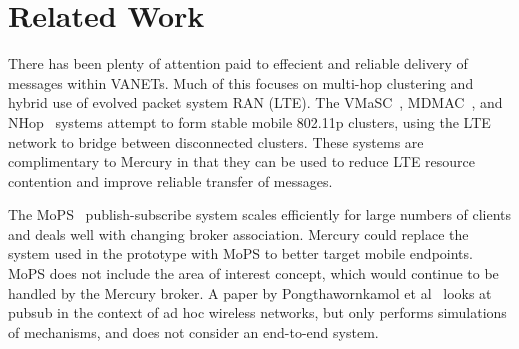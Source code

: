 \section{Related Work}

There has been plenty of attention paid to effecient and reliable
delivery of messages within VANETs.  Much of this focuses on multi-hop
clustering and hybrid use of evolved packet system RAN (LTE).  The
VMaSC~\cite{ucar2016multihop}, MDMAC~\cite{wolny2008modified}, and
NHop~\cite{zhang2011novel} systems attempt to form stable mobile
802.11p clusters, using the LTE network to bridge between disconnected
clusters. These systems are complimentary to Mercury in that they can
be used to reduce LTE resource contention and improve reliable
transfer of messages.

The MoPS~\cite{nasim2014mobile} publish-subscribe system scales
efficiently for large numbers of clients and deals well with changing
broker association.  Mercury could replace the \pubsub system used in
the prototype with MoPS to better target mobile endpoints. MoPS does
not include the area of interest concept, which would continue to be
handled by the Mercury broker. A paper by Pongthawornkamol et
al~\cite{pongthawornkamol2007analysis} looks at pubsub in the context
of ad hoc wireless networks, but only performs simulations of
mechanisms, and does not consider an end-to-end system.

